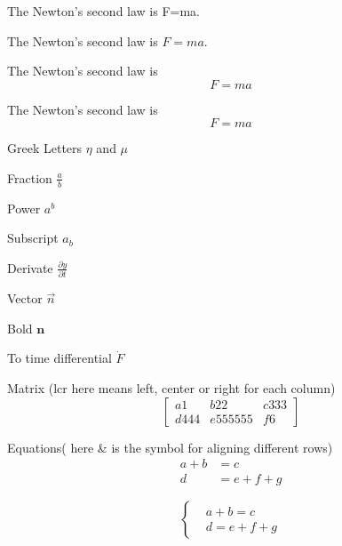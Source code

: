 \documentclass{article}
\begin{document}
	The Newton's second law is F=ma.

	The Newton's second law is $F=ma$.

	The Newton's second law is $$F=ma$$
 
	The Newton's second law is \[F=ma\]

	Greek Letters $\eta$ and $\mu$

	Fraction $\frac{a}{b}$

	Power $a^b$

	Subscript $a_b$

	Derivate $\frac{\partial y}{\partial t}$

	Vector $\vec{n}$

	Bold $\mathbf{n}$
	
	To time differential $\dot{F}$

	Matrix (lcr here means left, center or right for each column)
	\[
		\left[
			\begin{array}{lcr}
				a1 & b22 &c333 \\
				d444 & e555555&f6
			\end{array}
		\right]
	\]

	Equations( here \& is the symbol for aligning different rows)
	\begin{align}
		a+b&=c\\
		d&=e+f+g
	\end{align}
	
	\[ 
		\left\{
			\begin{aligned}
				&a+b=c\\
				&d=e+f+g
			\end{aligned}
		\right.
	\]
	
\end{document}
